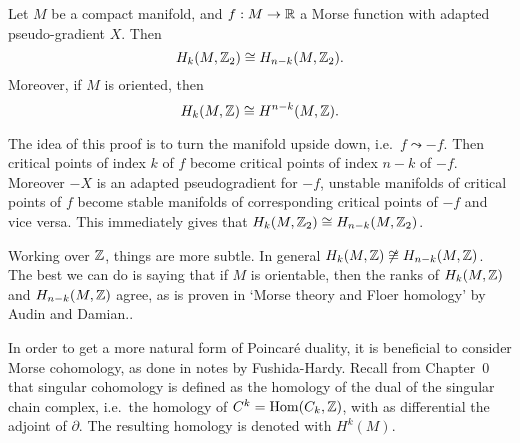 \begin{theorem}
    Let $M$ be a compact manifold, and $f: M \to  \mathbb{R}$ a Morse function with adapted pseudo-gradient $X$.
    Then
    \[
        H_k(M, \mathbb{Z}_2) \cong H_{n-k}(M, \mathbb{Z}_2)
    .\]
    Moreover, if $M$ is oriented, then \[
         H_{k}(M, \mathbb{Z}) \cong H^{n-k}(M, \mathbb{Z})
    .\]
\end{theorem}
\begin{myproof}
    The idea of this proof is to turn the manifold upside down, i.e.\ $f\leadsto -f$.
    Then critical points of index $k$ of $f$  become critical points of index $n-k$ of  $-f$.
    Moreover $-X$ is an adapted pseudogradient for $-f$, unstable manifolds of critical points of $f$ become stable manifolds of corresponding critical points of $-f$ and vice versa.
    This immediately gives that $H_k(M, \mathbb{Z}_2) \cong H_{n-k}(M, \mathbb{Z}_2)$.

    Working over $\mathbb{Z}$, things are more subtle.
    In general $H_k(M, \mathbb{Z}) \not \cong H_{n-k}(M, \mathbb{Z})$.
    The best we can do is saying that if $M$ is orientable, then the ranks of  $H_k(M, \mathbb{Z})$ and $H_{n-k}(M, \mathbb{Z})$ agree,
    as is proven in `Morse theory and Floer homology' by Audin and Damian..

    In order to get a more natural form of Poincaré duality, it is beneficial to consider Morse cohomology, as done in notes by Fushida-Hardy.
    Recall from Chapter~0 that singular cohomology is defined as the homology of the dual of the singular chain complex, i.e.\ the homology of $C^{k} = \operatorname{Hom}(C_k, \mathbb{Z})$, with as differential the adjoint of $\partial$. The resulting homology is denoted with $H^{k}(M)$.


\end{myproof}
